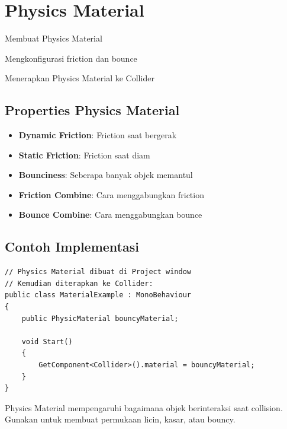 
\section{Physics Material}

\begin{learningoutcomes}
\item Membuat Physics Material
\item Mengkonfigurasi friction dan bounce
\item Menerapkan Physics Material ke Collider
\end{learningoutcomes}

\subsection{Properties Physics Material}

\begin{itemize}
\item \textbf{Dynamic Friction}: Friction saat bergerak
\item \textbf{Static Friction}: Friction saat diam
\item \textbf{Bounciness}: Seberapa banyak objek memantul
\item \textbf{Friction Combine}: Cara menggabungkan friction
\item \textbf{Bounce Combine}: Cara menggabungkan bounce
\end{itemize}

\subsection{Contoh Implementasi}

\begin{lstlisting}[language={[Sharp]C}]
// Physics Material dibuat di Project window
// Kemudian diterapkan ke Collider:
public class MaterialExample : MonoBehaviour
{
    public PhysicMaterial bouncyMaterial;
    
    void Start()
    {
        GetComponent<Collider>().material = bouncyMaterial;
    }
}
\end{lstlisting}

\begin{catatan}
Physics Material mempengaruhi bagaimana objek berinteraksi saat collision. Gunakan untuk membuat permukaan licin, kasar, atau bouncy.
\end{catatan}
